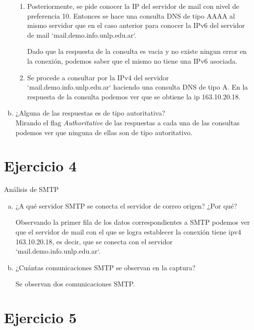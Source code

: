 \documentclass[osajnl,twocolumn,showpacs,superscriptaddress,10pt]{revtex4-1} %
\begin{document}
\begin{enumerate}[a)]
\begin{enumerate}[1.]
    \item Posteriormente, se pide conocer la IP del servidor de mail con nivel de preferencia 10. Entonces se hace una consulta DNS de tipo AAAA al mismo servidor que en el caso anterior para conocer la IPv6 del servidor de mail `mail.demo.info.unlp.edu.ar`.

    Dado que la respuesta de la consulta es vacia y no existe ningun error en la conexión, podemos saber que el mismo no tiene una IPv6 asociada. \\

    \item Se procede a consultar por la IPv4 del servidor `mail.demo.info.unlp.edu.ar` haciendo una consulta DNS de tipo A. En la respuesta de la consulta podemos ver que se obtiene la ip 163.10.20.18. \\
  \end{enumerate}

  \item ¿Alguna de las respuestas es de tipo autoritativa? \\

  Mirando el flag \textit{Authoritative} de las respuestas a cada una de las consultas podemos ver que ninguna de ellas son de tipo autoritativo. \\
\end{enumerate}

\section{Ejercicio 4}

Análisis de SMTP

\begin{enumerate}[a)]
  \item ¿A qué servidor SMTP se conecta el servidor de correo origen? ¿Por qué?

  Observando la primer fila de los datos correspondientes a SMTP podemos ver que el servidor de mail con el que se logra establecer la conexión tiene ipv4 163.10.20.18, es decir, que se conecta con el servidor `mail.demo.info.unlp.edu.ar`. \\

  \item ¿Cuántas comunicaciones SMTP se observan en la captura?

  Se observan dos comunicaciones SMTP. \\
\end{enumerate}

\section{Ejercicio 5}
\end{document}
